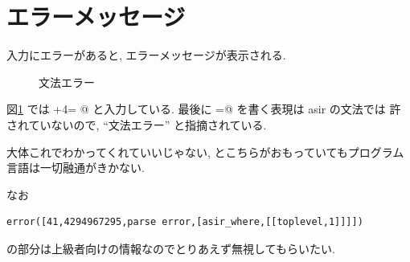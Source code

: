 \documentclass{jbook}
\begin{document}
\section{エラーメッセージ}

入力にエラーがあると, エラーメッセージが表示される.

\begin{figure}[htb]
\begin{center}
\end{center}
\caption{文法エラー} \label{fig:errorParseEq}
\end{figure}
図\ref{fig:errorParseEq} では
+4= @
と入力している. 最後に \verb@=@ を書く表現は asir の文法では
許されていないので,  ``文法エラー'' と指摘されている.  
\begin{screen}
大体これでわかってくれていいじゃない,
とこちらがおもっていてもプログラム言語は一切融通がきかない.
\end{screen}
なお
\begin{verbatim}
error([41,4294967295,parse error,[asir_where,[[toplevel,1]]]])
\end{verbatim}
の部分は上級者向けの情報なのでとりあえず無視してもらいたい.
\end{document}
